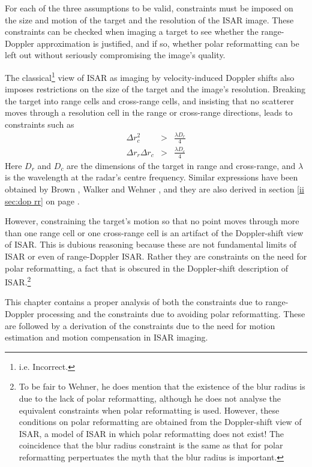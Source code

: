 For each of the three assumptions to be valid, constraints must be imposed on
the size and motion of the target and the resolution of the ISAR image.
These constraints can be checked when imaging a target to see whether the
range-Doppler approximation is justified, and if so, whether polar
reformatting can be left out without seriously compromising the image's
quality.

The classical\footnote{i.e. Incorrect.} view of ISAR as imaging by
velocity-induced Doppler shifts also imposes restrictions on the size of the
target and the image's resolution.  Breaking the target into range cells
and cross-range cells, and insisting that no scatterer moves through a
resolution cell in the range or cross-range directions, leads to constraints
such as \cite{Aus84}
\begin{eqnarray}
\Delta r_c^2&>&\frac{\lambda D_r}{4}\label{rmc eqn:prc I}\\
\Delta r_r \Delta r_c&>&\frac{\lambda D_c}{4}\label{rmc eqn:prc II}
\end{eqnarray}
Here $D_r$ and $D_c$ are the dimensions of the target in range and 
cross-range, and $\lambda$ is the wavelength at the radar's centre frequency.
Similar expressions have been obtained by Brown \cite{Bro69}, 
Walker \cite{Wal80} and Wehner \cite[eq.~(7.31)]{Weh87}, and they are also
derived in section \ref{ii sec:dop rr} on page \pageref{ii sec:dop rr}.


However, constraining the target's motion so that no point moves through
more than one range cell or one cross-range cell is an artifact of the
Doppler-shift view of ISAR.  This is dubious reasoning because these are not
fundamental limits of ISAR or even of range-Doppler ISAR. Rather they are
constraints on the need for polar reformatting, a fact that is obscured in
the Doppler-shift description of ISAR.\footnote{To be fair to Wehner, he
does mention that the existence of the blur radius is due to the lack of
polar reformatting, although he does not analyse the equivalent constraints
when polar reformatting is used. However, these conditions on polar
reformatting are obtained from the Doppler-shift view of ISAR, a model of
ISAR in which polar reformatting does not exist!  The coincidence that the
blur radius constraint is the same as that for polar reformatting 
perpertuates the myth that the blur radius is important.}

This chapter contains a proper analysis of both the constraints due to
range-Doppler processing and the constraints due to avoiding polar
reformatting.  These are followed by a derivation of the constraints due to
the need for motion estimation and motion compensation in ISAR imaging.

